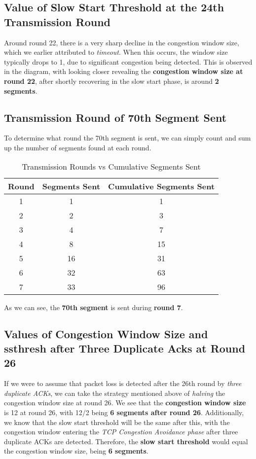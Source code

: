 \documentclass[colorlinks=true, allcolors=blue]{article}
\begin{document}
\subsection{Value of Slow Start Threshold at the 24th Transmission Round}
Around round 22, there is a very sharp decline in the congestion window size, which we earlier attributed to \textit{timeout}. When this occurs, the window size typically drops to 1, due to significant congestion being detected. This is observed in the diagram, with looking closer revealing the \textbf{congestion window size at round 22}, after shortly recovering in the slow start phase, is around \textbf{2 segments}.

\subsection{Transmission Round of 70th Segment Sent}
To determine what round the 70th segment is sent, we can simply count and sum up the number of segments found at each round.
\begin{table}[H]
\centering
\begin{tabular}{|c|c|c|}
\hline
\textbf{Round} & \textbf{Segments Sent} & \textbf{Cumulative Segments Sent} \\
\hline
1 & 1 & 1 \\
2 & 2 & 3 \\
3 & 4 & 7 \\
4 & 8 & 15 \\
5 & 16 & 31 \\
6 & 32 & 63 \\
7 & 33 & 96 \\
\hline
\end{tabular}
\caption{Transmission Rounds vs Cumulative Segments Sent}
\end{table}
As we can see, the \textbf{70th segment} is sent during \textbf{round 7}.

\subsection{Values of Congestion Window Size and ssthresh after Three Duplicate Acks at Round 26}
If we were to assume that packet loss is detected after the 26th round by \textit{three duplicate ACKs}, we can take the strategy mentioned above of \textit{halving} the congestion window size at round 26. We see that the \textbf{congestion window size} is 12 at round 26, with 12/2 being \textbf{6 segments after round 26}. Additionally, we know that the slow start threshold will be the same after this, with the congestion window entering the \textit{TCP Congestion Avoidance phase} after three duplicate ACKs are detected. Therefore, the \textbf{slow start threshold} would equal the congestion window size, being \textbf{6 segments}.
\end{document}
